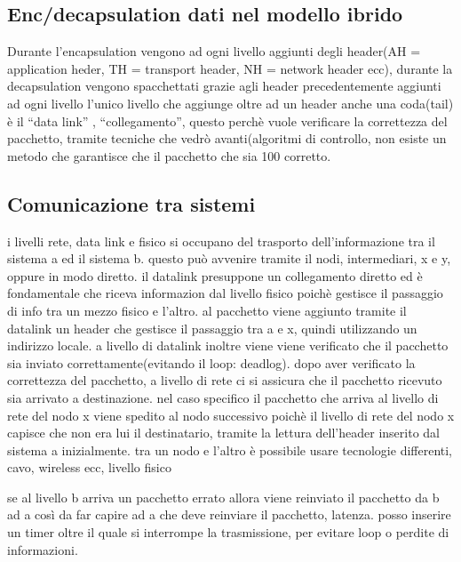 \subsection{Enc/decapsulation dati nel modello ibrido}
Durante l'encapsulation vengono ad ogni livello aggiunti degli header(AH = application heder, TH = transport header, NH = network header ecc), durante la decapsulation vengono spacchettati grazie agli header precedentemente aggiunti ad ogni livello
l'unico livello che aggiunge oltre ad un header anche una coda(tail) è il “data link” , “collegamento”, questo perchè vuole verificare la correttezza del pacchetto, tramite tecniche che vedrò avanti(algoritmi di controllo, non esiste un metodo che garantisce che il pacchetto che sia 100 corretto.%

\subsection{Comunicazione tra sistemi}
i livelli rete, data link e fisico si occupano del trasporto dell’informazione tra il sistema a ed il sistema b. questo può avvenire tramite il nodi, intermediari, x e y, oppure in modo diretto.
il datalink presuppone un collegamento diretto ed è fondamentale che riceva informazion dal livello fisico poichè gestisce il passaggio di info tra un mezzo fisico e l’altro. al pacchetto viene aggiunto tramite il datalink un header che gestisce il passaggio tra a e x, quindi utilizzando un indirizzo locale. a livello di datalink inoltre viene viene verificato che il pacchetto sia inviato correttamente(evitando il loop: deadlog). dopo aver verificato la correttezza del pacchetto, a livello di rete ci si assicura che il pacchetto ricevuto sia arrivato a destinazione. nel caso specifico il pacchetto che arriva al livello di rete del nodo x viene spedito al nodo successivo poichè il livello di rete del nodo x capisce che non era lui il destinatario, tramite la lettura dell’header inserito dal sistema a inizialmente. 
tra un nodo e l’altro è possibile usare tecnologie differenti, cavo, wireless ecc, livello fisico

se al livello b arriva un pacchetto errato allora viene reinviato il pacchetto da b ad a così da far capire ad a che deve reinviare il pacchetto, latenza.
posso inserire un timer oltre il quale si interrompe la trasmissione, per evitare loop o perdite di informazioni.

